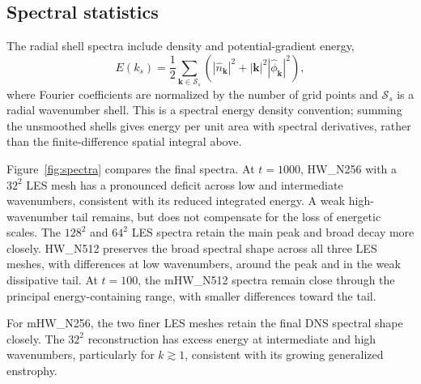 \documentclass[authoryear,preprint,review,12pt]{elsarticle}
\begin{document}
\subsection{Spectral statistics}

The radial shell spectra include density and potential-gradient energy,
\begin{equation}
 E(k_s)=\frac12\sum_{\mathbf{k}\in\mathcal{S}_s}
 \left(|\widehat n_{\mathbf{k}}|^2+|\mathbf{k}|^2|\widehat\phi_{\mathbf{k}}|^2\right),
\end{equation}
where Fourier coefficients are normalized by the number of grid points and $\mathcal{S}_s$ is a radial wavenumber shell. This is a spectral energy density convention; summing the unsmoothed shells gives energy per unit area with spectral derivatives, rather than the finite-difference spatial integral above.

Figure~\ref{fig:spectra} compares the final spectra. At $t=1000$, HW\_N256 with a $32^2$ LES mesh has a pronounced deficit across low and intermediate wavenumbers, consistent with its reduced integrated energy. A weak high-wavenumber tail remains, but does not compensate for the loss of energetic scales. The $128^2$ and $64^2$ LES spectra retain the main peak and broad decay more closely. HW\_N512 preserves the broad spectral shape across all three LES meshes, with differences at low wavenumbers, around the peak and in the weak dissipative tail. At $t=100$, the mHW\_N512 spectra remain close through the principal energy-containing range, with smaller differences toward the tail.

For mHW\_N256, the two finer LES meshes retain the final DNS spectral shape closely. The $32^2$ reconstruction has excess energy at intermediate and high wavenumbers, particularly for $k\gtrsim1$, consistent with its growing generalized enstrophy.

\end{document}
